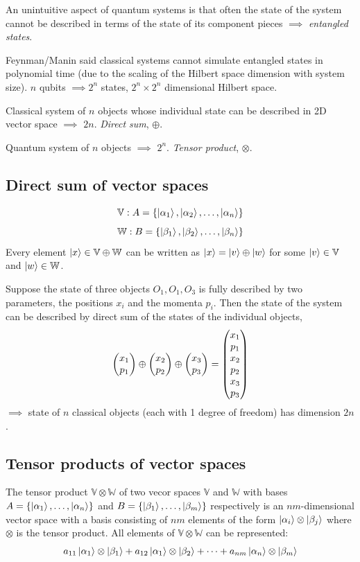 \documentclass[12pt]{article}
\begin{document}
An unintuitive aspect of quantum systems is that often the state of the system
cannot be described in terms of the state of its component pieces $\implies$
\emph{entangled states}.

Feynman/Manin said classical systems cannot simulate entangled states in
polynomial time (due to the scaling of the Hilbert space dimension with system
size). $n$ qubits $\implies 2^n$ states, $2^n \times 2^n$ dimensional Hilbert
space.

Classical system of $n$ objects whose individual state can be described in 2D
vector space $\implies$ $2n$. \emph{Direct sum}, $\oplus$.

Quantum system of $n$ objects $\implies$ $2^n$. \emph{Tensor product},
$\otimes$.

\subsection{Direct sum of vector spaces}
\renewcommand*{\VV}{\mathbb{V}}
\newcommand*{\WW}{\mathbb{W}}

\[\VV: A = \{\ket{\alpha_1}, \ket{\alpha_2}, \ldots, \ket{\alpha_n}\}\]
\[\WW: B = \{\ket{\beta_1}, \ket{\beta_2}, \ldots, \ket{\beta_n}\}\]
Every element $\ket{x} \in \VV \oplus \WW$ can be written as $\ket{x} = \ket{v}
\oplus \ket{w}$ for some $\ket{v} \in \VV$ and $\ket{w} \in \WW$.

Suppose the state of three objects $O_1, O_1, O_3$ is fully described by two
parameters, the positions $x_i$ and the momenta $p_i$. Then the state of the
system can be described by direct sum of the states of the individual objects,
\[\pmqty{x_1\\p_1} \oplus \pmqty{x_2\\p_2} \oplus \pmqty{x_3\\p_3}
= \pmqty{x_1\\p_1\\x_2\\p_2\\x_3\\p_3}\]
$\implies$ state of $n$ classical objects (each with 1 degree of freedom) has
dimension $2n$.

\subsection{Tensor products of vector spaces}
The tensor product $\VV \otimes \WW$ of two vecor spaces $\VV$ and $\WW$ with
bases $A = \{\ket{\alpha_1}, \ldots, \ket{\alpha_n}\}$ and  $B =
\{\ket{\beta_1}, \ldots, \ket{\beta_m}\}$ respectively is an $nm$-dimensional
vector space with a basis consisting of $nm$ elements of the form
$\ket{\alpha_i} \otimes \ket{\beta_j}$ where $\otimes$ is the tensor product.
All elements of $\VV \otimes \WW$ can be represented:
\[a_{11} \ket{\alpha_1} \otimes \ket{\beta_1} + a_{12} \ket{\alpha_1} \otimes
\ket{\beta_2} + \cdots + a_{nm}\ket{\alpha_n} \otimes \ket{\beta_m}\]
\end{document}
